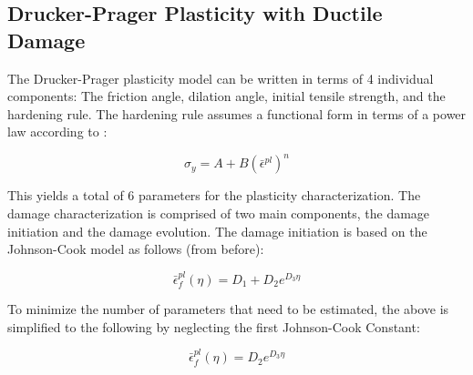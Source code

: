 \subsection{Drucker-Prager Plasticity with Ductile Damage}

The Drucker-Prager plasticity model can be written in terms of 4 individual
components: The friction angle, dilation angle, initial tensile strength,
and the hardening rule. The hardening rule assumes a functional form
in terms of a power law according to \cite{prantl_identification_2013}:

\begin{equation}
\sigma_{y}=A+B\left(\bar{\epsilon}^{pl}\right)^{n}\label{eqn:dparam5}
\end{equation}

This yields a total of 6 parameters for the plasticity characterization.
The damage characterization is comprised of two main components, the
damage initiation and the damage evolution. The damage initiation
is based on the Johnson-Cook model as follows (from before):

\begin{equation}
\bar{\epsilon}_{f}^{pl}\left(\eta\right)=D_{1}+D_{2}e^{D_{3}\eta}\label{eqn:dparam6}
\end{equation}


To minimize the number of parameters that need to be estimated, the
above is simplified to the following by neglecting the first Johnson-Cook
Constant:

\begin{equation}
\bar{\epsilon}_{f}^{pl}\left(\eta\right)=D_{2}e^{D_{3}\eta}\label{eqn:dparam6-1}
\end{equation}
